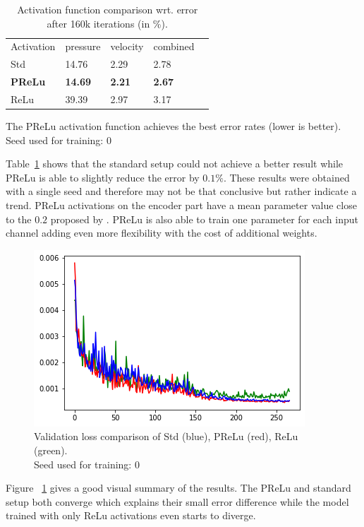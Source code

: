 \documentclass[acmtog]{techreportacmart}
\begin{document}
\begin{table}[h]
\caption{Activation function comparison wrt. error after 160k iterations (in \%).}
\label{tab:two}
\begin{center}
\begin{tabular}{l|l|l|l|l}
  \toprule
  Activation   & pressure   &	velocity    & combined \\
  Std	 & 14.76	  & 2.29		& 2.78   \\
  \bf PReLu	 & \bf 14.69	  & \bf 2.21		& \bf 2.67	   \\
  ReLu   & 39.39	  & 2.97		& 3.17	  \\
  \bottomrule
\end{tabular}
\end{center}
\bigskip\centering
\footnotesize The PReLu activation function achieves  
the best error rates (lower is better). \\
Seed used for training: $0$
\end{table}%

Table~\ref{tab:two} shows that the standard setup could not achieve a better result while PReLu 
is able to slightly reduce the error by $0.1\%$. These results were obtained with a single seed and therefore 
may not be that conclusive but rather indicate a trend. PReLu activations on the encoder part have 
a mean parameter value close to the $0.2$ proposed by \cite{Thuerey20}. PReLu is also able to train 
one parameter for each input channel adding even more flexibility with the cost of additional weights. 

\begin{figure}[h]
  \includegraphics[width=.4\textwidth]{figures/val_loss}
	\caption{Validation loss comparison of Std (blue), PReLu (red), ReLu (green). \\
	Seed used for training: $0$}
  \label{fig:val}
\end{figure}

Figure ~\ref{fig:val} gives a good visual summary of the results.
The PReLu and standard setup both converge which explains their small error difference while the model
trained with only ReLu activations even starts to diverge.
\end{document}
